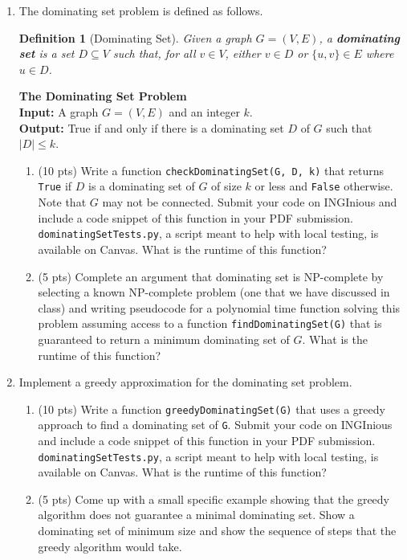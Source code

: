 \documentclass{article}
\newtheorem*{definition}{Definition}
\begin{document}
\begin{enumerate}
    \item The dominating set problem is defined as follows.
    \begin{definition}[Dominating Set]
    Given a graph $G=(V,E)$, a \textbf{dominating set} is a set $D \subseteq V$ such that, for all $v \in V$, either $v \in D$ or $\{u,v\} \in E$ where $u \in D$. 
    \end{definition}
    
    \noindent \textbf{The Dominating Set Problem} \\
    \noindent \textbf{Input:} A graph $G=(V,E)$ and an integer $k$.\\
    \noindent \textbf{Output:} True if and only if there is a dominating set $D$ of $G$ such that $|D| \leq k$. 
    \begin{enumerate}
        \item (10 pts) Write a function \verb|checkDominatingSet(G, D, k)| that returns \verb|True| if $D$ is a dominating set of $G$ of size $k$ or less and \verb|False| otherwise. Note that $G$ may not be connected. Submit your code on INGInious and include a code snippet of this function in your PDF submission. \verb|dominatingSetTests.py|, a script meant to help with local testing, is available on Canvas. What is the runtime of this function?
        \item (5 pts) Complete an argument that dominating set is NP-complete by selecting a known NP-complete problem (one that we have discussed in class) and writing pseudocode for a polynomial time function solving this problem assuming access to a function \verb|findDominatingSet(G)| that is guaranteed to return a minimum dominating set of $G$. What is the runtime of this function? \\
    \end{enumerate}

    \newpage 
    \item Implement a greedy approximation for the dominating set problem.
    \begin{enumerate}
        \item (10 pts) Write a function \verb|greedyDominatingSet(G)| that uses a greedy approach to find a dominating set of \verb|G|. Submit your code on INGInious and include a code snippet of this function in your PDF submission. \verb|dominatingSetTests.py|, a script meant to help with local testing, is available on Canvas. What is the runtime of this function?
        \item (5 pts) Come up with a small specific example showing that the greedy algorithm does not guarantee a minimal dominating set. Show a dominating set of minimum size and show the sequence of steps that the greedy algorithm would take.
    \end{enumerate}


\end{enumerate}
\end{document}
